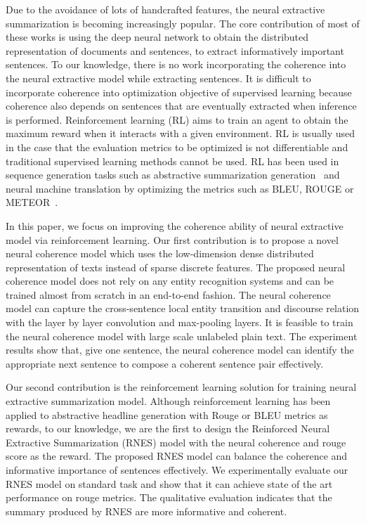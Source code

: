 \documentclass[letterpaper]{article} %
\begin{document}
	
	Due to the avoidance of lots of handcrafted features, the neural extractive summarization is becoming increasingly popular.  The core contribution of most of these works is using the deep neural network to obtain the distributed representation of documents and sentences, to extract informatively important sentences\cite{jianpeng2016}. To our knowledge, there is no work incorporating the coherence into the neural extractive model while extracting sentences. It is difficult to incorporate coherence into optimization objective of supervised learning because coherence also depends on sentences that are eventually extracted when inference is performed. Reinforcement learning (RL) aims to train an agent to obtain the maximum reward when it interacts with a given environment. RL is usually used in the case that the evaluation metrics to be optimized is not differentiable and traditional supervised learning methods cannot be used. RL has been used in sequence generation tasks such as abstractive summarization generation~\cite{socher2017_summarization} and neural machine translation by optimizing the metrics such as BLEU, ROUGE or METEOR~\cite{rl2nmt}.
	
	In this paper, we focus on improving the coherence ability of neural extractive model via reinforcement learning. Our first contribution is to propose a novel neural coherence model which uses the low-dimension dense distributed representation of texts instead of sparse discrete features. The proposed neural coherence model does not rely on any entity recognition systems and can be trained almost from scratch in an end-to-end fashion. The neural coherence model can capture the cross-sentence local entity transition and discourse relation with the layer by layer convolution and max-pooling layers. It is feasible to train the neural coherence model with large scale unlabeled plain text. The experiment results show that, give one sentence, the neural coherence model can identify the appropriate next sentence to compose a coherent sentence pair effectively. 
	
	
	Our second contribution is the reinforcement learning solution for training neural extractive summarization model. Although reinforcement learning has been applied to abstractive headline generation with Rouge or BLEU metrics as rewards\cite{socher2017_summarization,ayana2016}, to our knowledge, we are the first to design the Reinforced Neural Extractive Summarization (RNES) model with the neural coherence and rouge score as the reward. The proposed RNES model can balance the coherence and informative importance of sentences effectively. We experimentally evaluate our RNES model on standard task and show that it can achieve state of the art performance on rouge metrics. The qualitative evaluation indicates that the summary produced by RNES are more informative and coherent.
	
\end{document}
